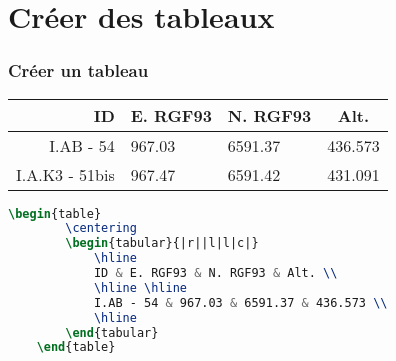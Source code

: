 \section{Créer des tableaux}

\begin{frame}[containsverbatim]
    \frametitle{Créer un tableau}
    \begin{table}
        \centering
        \begin{tabular}{|r||l|l|c|}
            \hline
            \textbf{ID} & \textbf{E. RGF93} & \textbf{N. RGF93} & \textbf{Alt.} \\
            \hline \hline
            I.AB - 54      & 967.03 & 6591.37  & 436.573    \\
            \hline
            I.A.K3 - 51bis & 967.47 & 6591.42  & 431.091    \\
            \hline
        \end{tabular}
    \end{table}
    \begin{lstlisting}[language=TeX]
    \begin{table}
        \centering
        \begin{tabular}{|r||l|l|c|}
            \hline
            ID & E. RGF93 & N. RGF93 & Alt. \\
            \hline \hline
            I.AB - 54 & 967.03 & 6591.37 & 436.573 \\
            \hline
        \end{tabular}
    \end{table}
    \end{lstlisting}
\end{frame}

